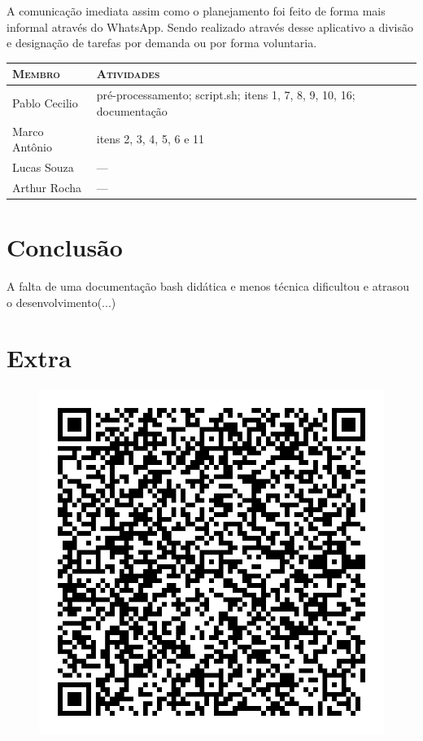 \documentclass[12pt]{article}
\begin{document}
A comunicação imediata assim como o planejamento foi feito de forma mais informal através do WhatsApp. Sendo realizado através desse aplicativo a divisão e designação de tarefas por demanda ou por forma voluntaria.

\begin{table}[!h]
    \begin{tabular}{p{5cm}p{7.5cm}}
    
        \textsc{Membro}      & \textsc{Atividades} \\ 
	    \hline
        Pablo Cecilio & pré-processamento; script.sh; itens 1, 7, 8, 9, 10, 16; documentação \\ 
        Marco Antônio & itens 2, 3, 4, 5, 6 e 11 \\
        Lucas Souza & --- \\
        Arthur Rocha & --- \\

    \end{tabular}
\end{table}

\section{Conclusão}

A falta de uma documentação bash didática e menos técnica dificultou e atrasou o desenvolvimento(...)

\pagebreak
\section{Extra}

\begin{figure}[h]
    \centering
    \includegraphics[scale=0.3]{imagens/extra.jpg}
\end{figure}
\end{document}
